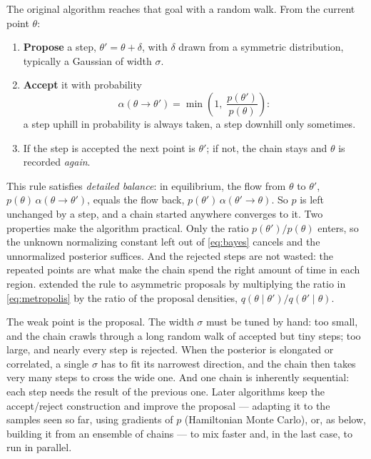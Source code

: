 The original algorithm \citep{metropolis1953,hastings1970} reaches that goal with a random walk.
From the current point $\theta$:
\begin{enumerate}[leftmargin=*, label=\arabic*.]
  \item \textbf{Propose} a step, $\theta' = \theta + \delta$, with $\delta$ drawn from a symmetric
        distribution, typically a Gaussian of width $\sigma$.
  \item \textbf{Accept} it with probability
        \begin{equation}
          \alpha(\theta \to \theta') = \min\!\left(1,\; \frac{p(\theta')}{p(\theta)}\right):
          \label{eq:metropolis}
        \end{equation}
        a step uphill in probability is always taken, a step downhill only sometimes.
  \item If the step is accepted the next point is $\theta'$; if not, the chain stays and $\theta$ is
        recorded \emph{again}.
\end{enumerate}
This rule satisfies \emph{detailed balance}: in equilibrium, the flow from $\theta$ to $\theta'$,
$p(\theta)\,\alpha(\theta\to\theta')$, equals the flow back, $p(\theta')\,\alpha(\theta'\to\theta)$.
So $p$ is left unchanged by a step, and a chain started anywhere converges to it. Two properties
make the algorithm practical. Only the ratio $p(\theta')/p(\theta)$ enters, so the unknown
normalizing constant left out of \cref{eq:bayes} cancels and the unnormalized posterior suffices.
And the rejected steps are not wasted: the repeated points are what make the chain spend the right
amount of time in each region.  extended the rule to asymmetric proposals by
multiplying the ratio in \cref{eq:metropolis} by the ratio of the proposal densities,
$q(\theta \mid \theta')/q(\theta' \mid \theta)$.

The weak point is the proposal. The width $\sigma$ must be tuned by hand: too small, and the chain
crawls through a long random walk of accepted but tiny steps; too large, and nearly every step is
rejected. When the posterior is elongated or correlated, a single $\sigma$ has to fit its narrowest
direction, and the chain then takes very many steps to cross the wide one. And one chain is
inherently sequential: each step needs the result of the previous one. Later algorithms keep the
accept/reject construction and improve the proposal --- adapting it to the samples seen so far,
using gradients of $p$ (Hamiltonian Monte Carlo), or, as below, building it from an ensemble of
chains --- to mix faster and, in the last case, to run in parallel.


